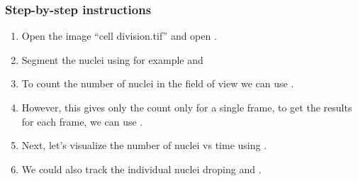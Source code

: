 \subsubsection*{Step-by-step instructions}

\begin{enumerate}
    \item Open the image ``cell division.tif'' and open .
    \item Segment the nuclei using for example  and 
    \item To count the number of nuclei in the field of view we can use  .
    \item However, this gives only the count only for a single frame, to get the results for each frame, we can use .
    \item Next, let's visualize the number of nuclei vs time using .
    \item We could also track the individual nuclei droping  and .
\end{enumerate}

